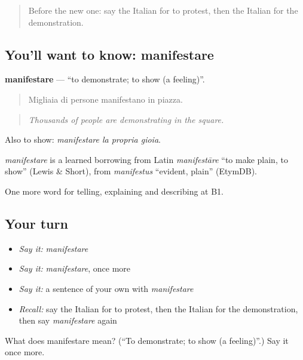 \begin{quote}
Before the new one: say the Italian for to protest, then the Italian for the demonstration.
\end{quote}

\subsection*{You'll want to know: manifestare}
\textbf{manifestare} — \textquotedblleft{}to demonstrate; to show (a feeling)\textquotedblright{}.

\begin{quote}
Migliaia di persone manifestano in piazza.
\end{quote}

\begin{quote}
\emph{Thousands of people are demonstrating in the square.}
\end{quote}

Also to show: \emph{manifestare la propria gioia}.

\begin{cousinweb}
\emph{manifestare} is a learned borrowing from Latin \emph{manifestāre} \textquotedblleft{}to make plain, to show\textquotedblright{} (Lewis \& Short), from \emph{manifestus} \textquotedblleft{}evident, plain\textquotedblright{} (EtymDB).
\end{cousinweb}

\begin{grammarlens}[title={What you've built}]
One more word for telling, explaining and describing at B1.
\end{grammarlens}

\subsection*{Your turn}
\begin{itemize}
\raggedright
  \item \emph{Say it:} \emph{manifestare}
  \item \emph{Say it:} \emph{manifestare}, once more
  \item \emph{Say it:} a sentence of your own with \emph{manifestare}
  \item \emph{Recall:} say the Italian for to protest, then the Italian for the demonstration, then say \emph{manifestare} again
\end{itemize}

\begin{tcolorbox}[breakable,colback=teal!4,colframe=teal!35!black,title={Before you move on}]
What does manifestare mean? (\textquotedblleft{}To demonstrate; to show (a feeling)\textquotedblright{}.) Say it once more.
\end{tcolorbox}
